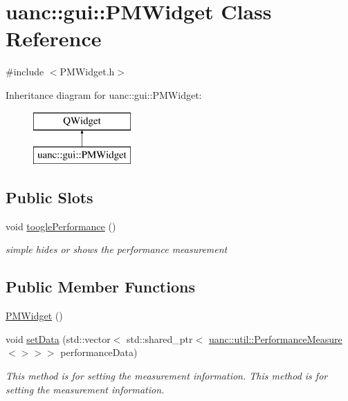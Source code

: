 \hypertarget{classuanc_1_1gui_1_1_p_m_widget}{}\section{uanc\+:\+:gui\+:\+:P\+M\+Widget Class Reference}
\label{classuanc_1_1gui_1_1_p_m_widget}


{\ttfamily \#include $<$P\+M\+Widget.\+h$>$}

Inheritance diagram for uanc\+:\+:gui\+:\+:P\+M\+Widget\+:\begin{figure}[H]
\begin{center}
\leavevmode
\includegraphics[height=2.000000cm]{classuanc_1_1gui_1_1_p_m_widget}
\end{center}
\end{figure}
\subsection*{Public Slots}
\begin{DoxyCompactItemize}
\item 
void \hyperlink{classuanc_1_1gui_1_1_p_m_widget_a308f665936b00c8f0b84174756ffbc5b}{toogle\+Performance} ()
\begin{DoxyCompactList}\small\item\em simple hides or shows the performance measurement \end{DoxyCompactList}\end{DoxyCompactItemize}
\subsection*{Public Member Functions}
\begin{DoxyCompactItemize}
\item 
\hyperlink{classuanc_1_1gui_1_1_p_m_widget_a0b42fd60ea9465083fa8b62189b23092}{P\+M\+Widget} ()
\item 
void \hyperlink{classuanc_1_1gui_1_1_p_m_widget_a072fa5f18b164d05a51407c088bf2ffb}{set\+Data} (std\+::vector$<$ std\+::shared\+\_\+ptr$<$ \hyperlink{classuanc_1_1util_1_1_performance_measure}{uanc\+::util\+::\+Performance\+Measure}$<$$>$$>$$>$ performance\+Data)
\begin{DoxyCompactList}\small\item\em This method is for setting the measurement information. This method is for setting the measurement information. \end{DoxyCompactList}\end{DoxyCompactItemize}


